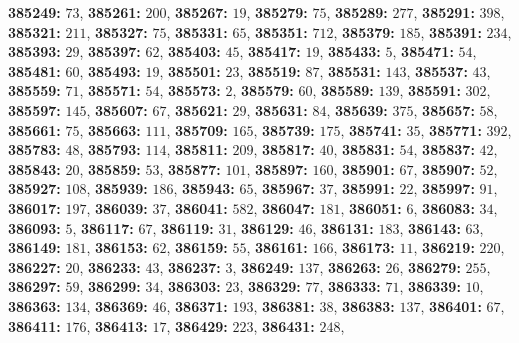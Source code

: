 \textsf{\bfseries 385249:} $73$, \textsf{\bfseries 385261:} $200$, \textsf{\bfseries 385267:} $19$, \textsf{\bfseries 385279:} $75$, \textsf{\bfseries 385289:} $277$, \textsf{\bfseries 385291:} $398$, \textsf{\bfseries 385321:} $211$, \textsf{\bfseries 385327:} $75$, \textsf{\bfseries 385331:} $65$, \textsf{\bfseries 385351:} $712$, \textsf{\bfseries 385379:} $185$, \textsf{\bfseries 385391:} $234$, \textsf{\bfseries 385393:} $29$, \textsf{\bfseries 385397:} $62$, \textsf{\bfseries 385403:} $45$, \textsf{\bfseries 385417:} $19$, \textsf{\bfseries 385433:} $5$, \textsf{\bfseries 385471:} $54$, \textsf{\bfseries 385481:} $60$, \textsf{\bfseries 385493:} $19$, \textsf{\bfseries 385501:} $23$, \textsf{\bfseries 385519:} $87$, \textsf{\bfseries 385531:} $143$, \textsf{\bfseries 385537:} $43$, \textsf{\bfseries 385559:} $71$, \textsf{\bfseries 385571:} $54$, \textsf{\bfseries 385573:} $2$, \textsf{\bfseries 385579:} $60$, \textsf{\bfseries 385589:} $139$, \textsf{\bfseries 385591:} $302$, \textsf{\bfseries 385597:} $145$, \textsf{\bfseries 385607:} $67$, \textsf{\bfseries 385621:} $29$, \textsf{\bfseries 385631:} $84$, \textsf{\bfseries 385639:} $375$, \textsf{\bfseries 385657:} $58$, \textsf{\bfseries 385661:} $75$, \textsf{\bfseries 385663:} $111$, \textsf{\bfseries 385709:} $165$, \textsf{\bfseries 385739:} $175$, \textsf{\bfseries 385741:} $35$, \textsf{\bfseries 385771:} $392$, \textsf{\bfseries 385783:} $48$, \textsf{\bfseries 385793:} $114$, \textsf{\bfseries 385811:} $209$, \textsf{\bfseries 385817:} $40$, \textsf{\bfseries 385831:} $54$, \textsf{\bfseries 385837:} $42$, \textsf{\bfseries 385843:} $20$, \textsf{\bfseries 385859:} $53$, \textsf{\bfseries 385877:} $101$, \textsf{\bfseries 385897:} $160$, \textsf{\bfseries 385901:} $67$, \textsf{\bfseries 385907:} $52$, \textsf{\bfseries 385927:} $108$, \textsf{\bfseries 385939:} $186$, \textsf{\bfseries 385943:} $65$, \textsf{\bfseries 385967:} $37$, \textsf{\bfseries 385991:} $22$, \textsf{\bfseries 385997:} $91$, \textsf{\bfseries 386017:} $197$, \textsf{\bfseries 386039:} $37$, \textsf{\bfseries 386041:} $582$, \textsf{\bfseries 386047:} $181$, \textsf{\bfseries 386051:} $6$, \textsf{\bfseries 386083:} $34$, \textsf{\bfseries 386093:} $5$, \textsf{\bfseries 386117:} $67$, \textsf{\bfseries 386119:} $31$, \textsf{\bfseries 386129:} $46$, \textsf{\bfseries 386131:} $183$, \textsf{\bfseries 386143:} $63$, \textsf{\bfseries 386149:} $181$, \textsf{\bfseries 386153:} $62$, \textsf{\bfseries 386159:} $55$, \textsf{\bfseries 386161:} $166$, \textsf{\bfseries 386173:} $11$, \textsf{\bfseries 386219:} $220$, \textsf{\bfseries 386227:} $20$, \textsf{\bfseries 386233:} $43$, \textsf{\bfseries 386237:} $3$, \textsf{\bfseries 386249:} $137$, \textsf{\bfseries 386263:} $26$, \textsf{\bfseries 386279:} $255$, \textsf{\bfseries 386297:} $59$, \textsf{\bfseries 386299:} $34$, \textsf{\bfseries 386303:} $23$, \textsf{\bfseries 386329:} $77$, \textsf{\bfseries 386333:} $71$, \textsf{\bfseries 386339:} $10$, \textsf{\bfseries 386363:} $134$, \textsf{\bfseries 386369:} $46$, \textsf{\bfseries 386371:} $193$, \textsf{\bfseries 386381:} $38$, \textsf{\bfseries 386383:} $137$, \textsf{\bfseries 386401:} $67$, \textsf{\bfseries 386411:} $176$, \textsf{\bfseries 386413:} $17$, \textsf{\bfseries 386429:} $223$, \textsf{\bfseries 386431:} $248$, 
